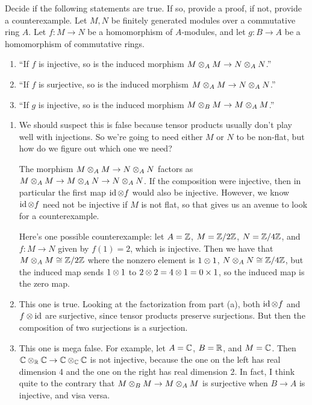 \begin{question}[subtitle = August 2021 Problem 4,ID=Aug21_4]
Decide if the following statements are true. If so, provide a proof, if not, provide a counterexample. Let $M,N$ be finitely generated modules over a commutative ring $A$. Let $f \colon M \to N$ be a homomorphism of $A$-modules, and let $g \colon B \to A$ be a homomorphism of commutative rings.
\begin{enumerate}
    \item ``If $f$ is injective, so is the induced morphism $M \otimes_A M \to N \otimes_A N$.''
    \item ``If $f$ is surjective, so is the induced morphism $M \otimes_A M \to N \otimes_A N$.''
    \item ``If $g$ is injective, so is the induced morphism $M \otimes_B M \to M \otimes_A M$.''
\end{enumerate}
\end{question}
\begin{solution}
\begin{enumerate}
    \item We should suspect this is false because tensor products usually don't play well with injections. So we're going to need either $M$ or $N$ to be non-flat, but how do we figure out which one we need?
    
    The morphism $M \otimes_A M \to N \otimes_A N$ factors as $M\otimes_A M \to M\otimes_A N \to N \otimes_A N$. If the composition were injective, then in particular the first map $\operatorname{id}\otimes f$ would also be injective. However, we know $\operatorname{id}\otimes f$ need not be injective if $M$ is not flat, so that gives us an avenue to look for a counterexample.
    
    Here's one possible counterexample: let $A = \mathbb{Z}$, $M = \mathbb{Z}/2\mathbb{Z}$, $N = \mathbb{Z}/4\mathbb{Z}$, and $f\colon M \to N$ given by $f(1) = 2$, which is injective. Then we have that $M \otimes_A M \cong \mathbb{Z}/2\mathbb{Z}$ where the nonzero element is $1 \otimes 1$, $N \otimes_A N \cong \mathbb{Z}/4\mathbb{Z}$, but the induced map sends $1 \otimes 1$ to $2 \otimes 2 = 4 \otimes 1 = 0 \times 1$, so the induced map is the zero map.
    \item This one is true. Looking at the factorization from part (a), both $\operatorname{id} \otimes f$ and $f \otimes \operatorname{id}$ are surjective, since tensor products preserve surjections. But then the composition of two surjections is a surjection.
    \item This one is mega false. For example, let $A = \mathbb{C}$, $B = \mathbb{R}$, and $M = \mathbb{C}$. Then $\mathbb{C} \otimes_{\mathbb{R}} \mathbb{C} \to \mathbb{C} \otimes_{\mathbb{C}} \mathbb{C}$ is not injective, because the one on the left has real dimension 4 and the one on the right has real dimension 2. In fact, I think quite to the contrary that $M \otimes_B M \to M \otimes_A M$ is surjective when $B \to A$ is injective, and visa versa.
\end{enumerate}
\end{solution}

